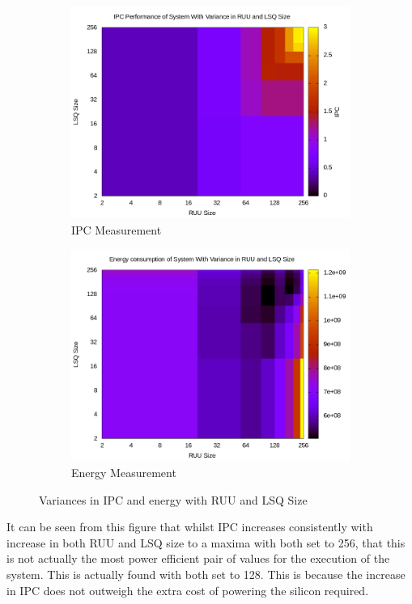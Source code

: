 \documentclass[paper=a4, fontsize=11pt]{scrartcl} %
\numberwithin{equation}{section} %
\numberwithin{figure}{section} %
\numberwithin{table}{section} %
\begin{document}
\begin{figure}
\centering
\begin{subfigure}{0.5\textwidth}
  \centering
\includegraphics[width=\linewidth]{graphs/ruulsqipc.png}
 \caption{IPC Measurement}
\end{subfigure}%
\begin{subfigure}{0.5\textwidth}
  \centering
  \includegraphics[width=\linewidth]{graphs/ruulsqenergy.png}
 \caption{Energy Measurement}
\end{subfigure}
\caption{Variances in IPC and energy with RUU and LSQ Size}
\end{figure}

It can be seen from this figure that whilst IPC increases consistently with increase in both RUU and LSQ size to a maxima with both set to 256, that this is not actually the most power efficient pair of values for the execution of the system.  This is actually found with both set to 128.  This is because the increase in IPC does not outweigh the extra cost of powering the silicon required.
\end{document}
